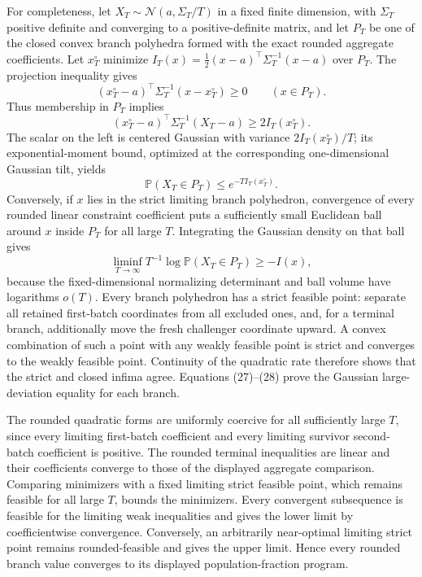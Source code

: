 For completeness, let \(X_T\sim\mathcal N(a,\Sigma_T/T)\) in a fixed finite dimension, with \(\Sigma_T\) positive definite and converging to a positive-definite matrix, and let \(P_T\) be one of the closed convex branch polyhedra formed with the exact rounded aggregate coefficients. Let \(x_T^\circ\) minimize \(I_T(x)=\tfrac12(x-a)^\top\Sigma_T^{-1}(x-a)\) over \(P_T\). The projection inequality gives
\[
 (x_T^\circ-a)^\top\Sigma_T^{-1}(x-x_T^\circ)\ge0\qquad(x\in P_T). \tag{26}
\]
Thus membership in \(P_T\) implies
\[
 (x_T^\circ-a)^\top\Sigma_T^{-1}(X_T-a)\ge 2I_T(x_T^\circ).
\]
The scalar on the left is centered Gaussian with variance \(2I_T(x_T^\circ)/T\); its exponential-moment bound, optimized at the corresponding one-dimensional Gaussian tilt, yields
\[
 \mathbb P(X_T\in P_T)\le e^{-T I_T(x_T^\circ)}. \tag{27}
\]
Conversely, if \(x\) lies in the strict limiting branch polyhedron, convergence of every rounded linear constraint coefficient puts a sufficiently small Euclidean ball around \(x\) inside \(P_T\) for all large \(T\). Integrating the Gaussian density on that ball gives
\[
 \liminf_{T\to\infty}T^{-1}\log\mathbb P(X_T\in P_T)\ge-I(x), \tag{28}
\]
because the fixed-dimensional normalizing determinant and ball volume have logarithms \(o(T)\). Every branch polyhedron has a strict feasible point: separate all retained first-batch coordinates from all excluded ones, and, for a terminal branch, additionally move the fresh challenger coordinate upward. A convex combination of such a point with any weakly feasible point is strict and converges to the weakly feasible point. Continuity of the quadratic rate therefore shows that the strict and closed infima agree. Equations (27)--(28) prove the Gaussian large-deviation equality for each branch.

The rounded quadratic forms are uniformly coercive for all sufficiently large \(T\), since every limiting first-batch coefficient and every limiting survivor second-batch coefficient is positive. The rounded terminal inequalities are linear and their coefficients converge to those of the displayed aggregate comparison. Comparing minimizers with a fixed limiting strict feasible point, which remains feasible for all large \(T\), bounds the minimizers. Every convergent subsequence is feasible for the limiting weak inequalities and gives the lower limit by coefficientwise convergence. Conversely, an arbitrarily near-optimal limiting strict point remains rounded-feasible and gives the upper limit. Hence every rounded branch value converges to its displayed population-fraction program.

